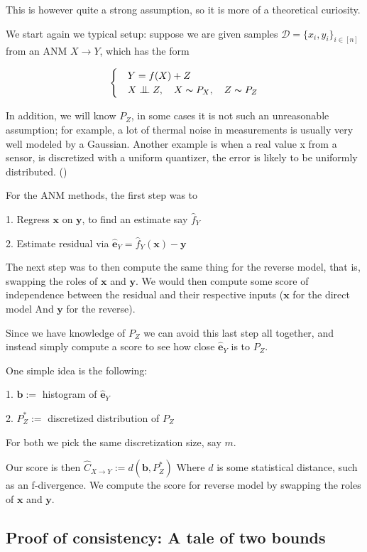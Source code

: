 This is however quite a strong assumption, so it is more of a theoretical curiosity. 

We start again we typical setup:
suppose we are given samples $\mathcal{D} = \{x_i, y_i\}_{i \in [n]}$ from an ANM $X \rightarrow Y$, which has the form

\[
    \begin{cases} 
        & Y = f(X) + Z \\
        & X \bigCI Z,\quad X \thicksim P_X,\quad Z \thicksim P_{Z}  
     \end{cases}  
\]

In addition, we will know $P_{Z}$, in some cases it is not such an unreasonable assumption; for example, 
a lot of thermal noise in measurements is usually very well modeled by a Gaussian. Another example 
is when a real value x from a sensor, is discretized with a uniform quantizer, the error is 
likely to be uniformly distributed. (\cite{uniformCond})

For the ANM methods, the first step was to 

1. Regress $\mathbf{x}$ on $\mathbf{y}$, to find an estimate say $\hat{f}_Y$

2. Estimate residual via $\mathbf{\hat{e}}_Y = \hat{f}_Y(\mathbf{x}) - \mathbf{y}$

The next step was to then compute the same thing for the reverse model, that is, swapping the 
roles of $\mathbf{x}$ and $\mathbf{y}$. We would then compute some score of independence 
between the residual and their respective inputs ($\mathbf{x}$ for the direct model And
 $\mathbf{y}$ for the reverse). 

 Since we have knowledge of $P_Z$ we can avoid this last step all together, and instead simply 
 compute a score to see how close $\mathbf{\hat{e}}_Y$ is to $P_Z$. 

 One simple idea is the following:

 1. $\mathbf{b} :=$ histogram of $\mathbf{\hat{e}}_Y$

 2. $P^*_Z :=$  discretized distribution of $P_Z$

 For both we pick the same discretization size, say $m$. 

 Our score is then 
 $
     \hat{C}_{X \rightarrow Y} := d\left(\mathbf{b}, P^*_Z \right)
 $
 Where $d$ is some statistical distance, such as an f-divergence. We compute the score for reverse model 
 by swapping the roles of $\mathbf{x}$ and $\mathbf{y}$.


\subsection{Proof of consistency: A tale of two bounds}

